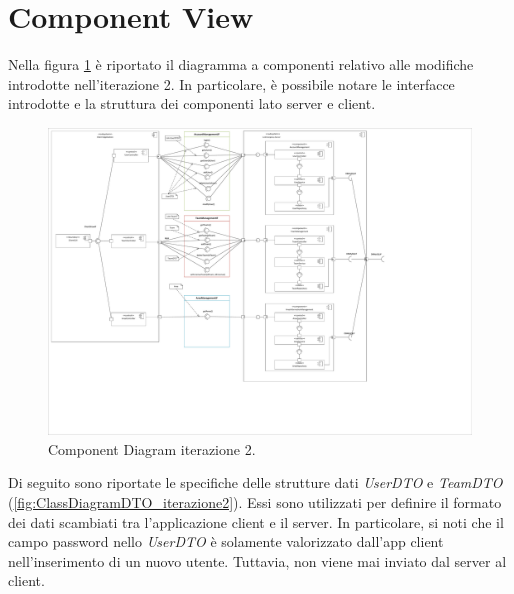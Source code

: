 \section{Component View}
Nella figura \ref{fig:ComponentDiagram_iterazione2} è riportato il diagramma a componenti relativo alle modifiche introdotte nell'iterazione 2. In particolare, è possibile notare le interfacce introdotte e la struttura dei componenti lato server e client.

\begin{figure}[h!]
	\centering
	\includegraphics[width=1\linewidth]{./Iterazione 2/OtherFiles/UML - Component View}
	\caption{Component Diagram iterazione 2.}
	\label{fig:ComponentDiagram_iterazione2}
\end{figure}

\clearpage

Di seguito sono riportate le specifiche delle strutture dati \textit{UserDTO} e \textit{TeamDTO} (\Fig\ref{fig:ClassDiagramDTO_iterazione2}). Essi sono utilizzati per definire il formato dei dati scambiati tra l'applicazione client e il server. In particolare, si noti che il campo password nello \textit{UserDTO} è solamente valorizzato dall'app client nell'inserimento di un nuovo utente. Tuttavia, non viene mai inviato dal server al client.  

